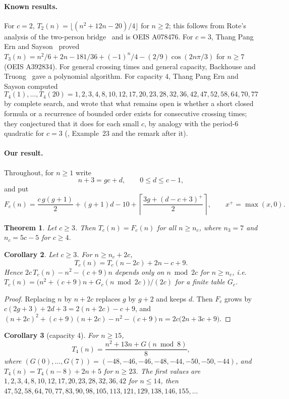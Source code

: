 \documentclass[11pt]{article}
\newtheorem{theorem}{Theorem}
\newtheorem{corollary}[theorem]{Corollary}
\theoremstyle{remark}
\newcommand{\ceil}[1]{\left\lceil #1\right\rceil}
\begin{document}
\paragraph{Known results.} For $c=2$, $T_2(n)=\lfloor (n^2+12n-20)/4\rfloor$ for $n\ge2$; this follows from Rote's analysis of the two-person bridge~\cite{rote} and is OEIS A078476. For $c=3$, Thang Pang Ern and Sayson~\cite{pes} proved
$T_3(n)=n^2/6+2n-181/36+(-1)^n/4-(2/9)\cos(2n\pi/3)$ for $n\ge7$ (OEIS A392834). For general crossing times and general capacity, Backhouse and Truong~\cite{bt08,bt15} gave a polynomial algorithm. For capacity $4$, Thang Pang Ern and Sayson computed
\[
T_4(1),\dots,T_4(20)=1,2,3,4,8,10,12,17,20,23,28,32,36,42,47,52,58,64,70,77
\]
by complete search, and wrote that what remains open is whether a short closed formula or a recurrence of bounded order exists for consecutive crossing times; they conjectured that it does for each small $c$, by analogy with the period-$6$ quadratic for $c=3$ (\cite{pes}, Example~23 and the remark after it).

\paragraph{Our result.} Throughout, for $n\ge1$ write
\[
n+3=gc+d,\qquad 0\le d\le c-1,
\]
and put
\begin{equation}\label{eq:F}
F_c(n)=\frac{c\,g(g+1)}{2}+(g+1)d-10+\ceil{\frac{3g+(d-c+3)^+}{2}},\qquad x^+=\max(x,0).
\end{equation}

\begin{theorem}\label{thm:main}
Let $c\ge3$. Then $T_c(n)=F_c(n)$ for all $n\ge n_c$, where $n_3=7$ and $n_c=5c-5$ for $c\ge4$.
\end{theorem}

\begin{corollary}\label{cor:rec}
Let $c\ge3$. For $n\ge n_c+2c$,
\[
T_c(n)=T_c(n-2c)+2n-c+9 .
\]
Hence $2c\,T_c(n)-n^2-(c+9)n$ depends only on $n \bmod 2c$ for $n\ge n_c$, i.e.\ $T_c(n)=\bigl(n^2+(c+9)n+G_c(n\bmod 2c)\bigr)/(2c)$ for a finite table $G_c$.
\end{corollary}

\begin{proof}
Replacing $n$ by $n+2c$ replaces $g$ by $g+2$ and keeps $d$. Then $F_c$ grows by $c(2g+3)+2d+3=2(n+2c)-c+9$, and $(n+2c)^2+(c+9)(n+2c)-n^2-(c+9)n=2c\bigl(2n+3c+9\bigr)$.
\end{proof}

\begin{corollary}[capacity 4]\label{cor:c4}
For $n\ge15$,
\[
T_4(n)=\frac{n^2+13n+G(n\bmod 8)}{8},
\]
where $(G(0),\dots,G(7))=(-48,-46,-46,-48,-44,-50,-50,-44)$,
and $T_4(n)=T_4(n-8)+2n+5$ for $n\ge23$. The first values are $1,2,3,4,8,10,12,17,20,23,28,32,36,42$ for $n\le14$, then $47,52,58,64,70,77,83,90,98,105,113,121,129,138,146,155,\dots$
\end{corollary}
\end{document}
